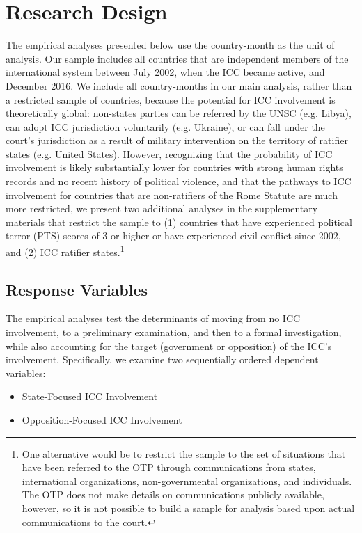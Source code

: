 \section*{Research Design}

The empirical analyses presented below use the country-month as the unit of analysis. Our sample includes all countries that are independent members of the international system between July 2002, when the ICC became active, and December 2016. We include all country-months in our main analysis, rather than a restricted sample of countries, because the potential for ICC involvement is theoretically global: non-states parties can be referred by the UNSC (e.g. Libya), can adopt ICC jurisdiction voluntarily (e.g. Ukraine), or can fall under the court's jurisdiction as a result of military intervention on the territory of ratifier states (e.g. United States). However, recognizing that the probability of ICC involvement is likely substantially lower for countries with strong human rights records and no recent history of political violence, and that the pathways to ICC involvement for countries that are non-ratifiers of the Rome Statute are much more restricted, we present two additional analyses in the supplementary materials that restrict the sample to (1) countries that have experienced political terror (PTS) scores of 3 or higher or have experienced civil conflict since 2002, and (2) ICC ratifier states.\footnote{One alternative would be to restrict the sample to the set of situations that have been referred to the OTP through communications from states, international organizations, non-governmental organizations, and individuals. The OTP does not make details on communications publicly available, however, so it is not possible to build a sample for analysis based upon actual communications to the court.}

\subsection*{Response Variables}

The empirical analyses test the determinants of moving from no ICC involvement, to a preliminary examination, and then to a formal investigation, while also accounting for the target (government or opposition) of the ICC's involvement. Specifically, we examine two sequentially ordered dependent variables:

\begin{itemize}
	\item State-Focused ICC Involvement
	\item Opposition-Focused ICC Involvement
\end{itemize}

